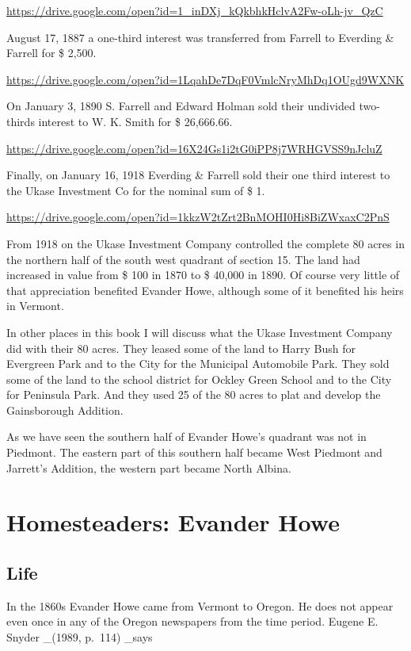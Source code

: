 \documentclass[
  12pt,
]{book}
\begin{document}
\url{https://drive.google.com/open?id=1_inDXj_kQkbhkHclvA2Fw-oLh-jv_QzC}

August 17, 1887 a one-third interest was transferred from Farrell to Everding \& Farrell for \$ 2,500.

\url{https://drive.google.com/open?id=1LqahDe7DqF0VmlcNryMhDq1OUgd9WXNK}

On January 3, 1890 S. Farrell and Edward Holman sold their undivided two-thirds interest to W. K. Smith for \$ 26,666.66.

\url{https://drive.google.com/open?id=16X24Gs1i2tG0iPP8j7WRHGVSS9nJcluZ}

Finally, on January 16, 1918 Everding \& Farrell sold their one third interest to the Ukase Investment Co for the nominal sum of \$ 1.

\url{https://drive.google.com/open?id=1kkzW2tZrt2BnMOHI0Hi8BiZWxaxC2PnS}

From 1918 on the Ukase Investment Company controlled the complete 80 acres in the northern half of the south west quadrant of section 15. The land had increased in value from
\$ 100 in 1870 to \$ 40,000 in 1890. Of course very little of that appreciation benefited Evander Howe, although some of it benefited his heirs in Vermont.

In other places in this book I will discuss what the Ukase Investment Company did with their 80 acres. They leased some of the land to Harry Bush for Evergreen Park and to the City for the Municipal Automobile Park. They sold some of the land to the school district for Ockley Green School and to the City for Peninsula Park. And they used 25 of the 80 acres to plat and develop the Gainsborough Addition.

As we have seen the southern half of Evander Howe's quadrant was not in Piedmont. The eastern part of this southern half became West Piedmont and Jarrett's Addition, the western part became North Albina.

\hypertarget{homesteaders-evander-howe}{%
\section{Homesteaders: Evander Howe}\label{homesteaders-evander-howe}}

\hypertarget{life}{%
\subsection{Life}\label{life}}

In the 1860s Evander Howe came from Vermont to Oregon. He does not appear even once in any of the Oregon newspapers from the time period. Eugene E. Snyder \_(1989, p.~114) \_says
\end{document}
